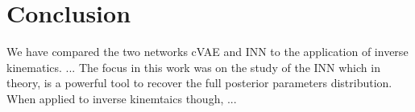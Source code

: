 \documentclass[conference]{IEEEtran}
\begin{document}
\section*{Conclusion}

We have compared the two networks cVAE and INN to the application of inverse kinematics. ...
The focus in this work was on the study of the INN which in theory, is a powerful tool to recover the full posterior parameters distribution. When applied to inverse kinemtaics though, ...


\nocite{*}


\end{document}
